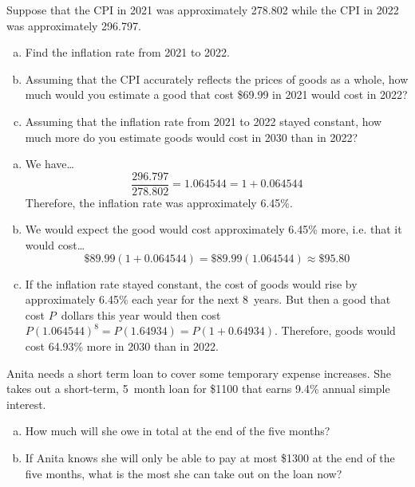 \documentclass[11pt,letterpaper]{article}
\begin{document}

 Suppose that the CPI in 2021 was approximately 278.802 while the CPI in 2022 was approximately 296.797. 
	\begin{enumerate}[(a)]
	\item Find the inflation rate from 2021 to 2022. 
	\item Assuming that the CPI accurately reflects the prices of goods as a whole, how much would you estimate a good that cost \$69.99 in 2021 would cost in 2022?
	\item Assuming that the inflation rate from 2021 to 2022 stayed constant, how much more do you estimate goods would cost in 2030 than in 2022?
	\end{enumerate} \pspace

\sol 
\begin{enumerate}[(a)]
\item We have\dots
	\[
	\dfrac{296.797}{278.802}= 1.064544= 1 + 0.064544
	\]
Therefore, the inflation rate was approximately 6.45\%. \pspace

\item We would expect the good would cost approximately 6.45\% more, i.e. that it would cost\dots
	\[
	\$89.99(1 + 0.064544)= \$89.99 (1.064544) \approx \$95.80
	\] \pspace

\item If the inflation rate stayed constant, the cost of goods would rise by approximately 6.45\% each year for the next 8~years. But then a good that cost $P$~dollars this year would then cost $P(1.064544)^8= P(1.64934)= P(1 + 0.64934)$. Therefore, goods would cost 64.93\% more in 2030 than in 2022. 
\end{enumerate}



\newpage



 Anita needs a short term loan to cover some temporary expense increases. She takes out a short-term, 5~month loan for \$1100 that earns 9.4\% annual simple interest. 
	\begin{enumerate}[(a)]
	\item How much will she owe in total at the end of the five months?
	\item If Anita knows she will only be able to pay at most \$1300 at the end of the five months, what is the most she can take out on the loan now?
	\end{enumerate} \pspace
\end{document}
